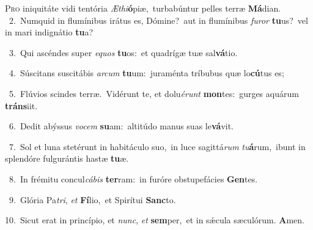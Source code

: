 \lettrine{\initial\textcolor{\initialcolor}{P}}{ro} iniquitáte vidi tentória \textit{Æ}\-\textit{thi}\textbf{ó}piæ,~\star turbabúntur pelles terræ \textbf{Má}\-dian.\\
{\numbfont\textcolor{\numbcolor}{~2.}}~Numquid in flumínibus irátus es, Dómine?~\dagger aut in flumínibus \textit{fu}\-\textit{ror} \textbf{tu}\-us?~\star vel in mari indignátio \textbf{tu}\-a?\par
{\numbfont\textcolor{\numbcolor}{~3.}}~Qui ascéndes super \textit{e}\-\textit{quos} \textbf{tu}\-os:~\star et quadrígæ tuæ sal\-\textbf{vá}\-tio.\par
{\numbfont\textcolor{\numbcolor}{~4.}}~Súscitans suscitábis \textit{ar}\-\textit{cum} \textbf{tu}\-um:~\star juraménta tríbubus quæ lo\-\textbf{cú}\-tus es;\par
{\numbfont\textcolor{\numbcolor}{~5.}}~Flúvios scindes terræ.~\dagger Vidérunt te, et dolu\-\textit{é}\-\textit{runt} \textbf{mon}\-tes:~\star gurges aquárum \textbf{tráns}\-iit.\par
{\numbfont\textcolor{\numbcolor}{~6.}}~Dedit abýssus \textit{vo}\-\textit{cem} \textbf{su}\-am:~\star altitúdo manus suas le\-\textbf{vá}\-vit.\par
{\numbfont\textcolor{\numbcolor}{~7.}}~Sol et luna stetérunt in habitáculo suo,~\dagger in luce sagittá\textit{rum} \textit{tu}\-\textbf{á}rum,~\star ibunt in splendóre fulgurántis hastæ \textbf{tu}\-æ.\par
{\numbfont\textcolor{\numbcolor}{~8.}}~In frémitu concul\-\textit{cá}\-\textit{bis} \textbf{ter}\-ram:~\star in furóre obstupefácies \textbf{Gen}\-tes.\par
{\numbfont\textcolor{\numbcolor}{~9.}}~Glória Pa\-\textit{tri}\-, \textit{et} \textbf{Fí}\-lio,~\star et Spirítui \textbf{Sanc}\-to.\par
{\numbfont\textcolor{\numbcolor}{10.}}~Sicut erat in princípio, et \textit{nunc}\-, \textit{et} \textbf{sem}\-per,~\star et in sǽcula sæculórum. \textbf{A}\-men.\par

